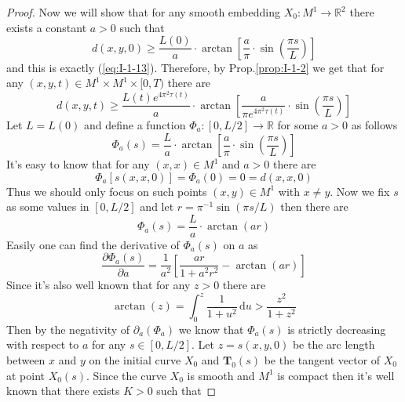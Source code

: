\begin{proof}
    Now we will show that for any smooth embedding $X_0:M^1\to\mathbb{R}^2$ there exists a constant $a>0$ such that
    \begin{equation}\label{eq:I-1-12}
        d(x,y,0)\ge\frac{L(0)}{a}\cdot\arctan{\left[\frac{a}{\pi}\cdot\sin{\left(\frac{\pi s}{L}\right)}\right]}
    \end{equation}
    and this is exactly (\ref{eq:I-1-13}). Therefore, by Prop.\ref{prop:I-1-2} we get that for any $(x,y,t)\in M^1\times M^1\times[0,T)$ there are
    \begin{equation}\label{eq:I-1-14}
        d(x,y,t)\ge\frac{L(t)e^{4\pi^2\tau{(t)}}}{a}\cdot\arctan{\left[\frac{a}{\pi e^{4\pi^2\tau{(t)}}}\cdot\sin{\left(\frac{\pi s}{L}\right)}\right]}
    \end{equation}
    Let $L=L(0)$ and define a function $\Phi_a:[0,L/2]\to\mathbb{R}$ for some $a>0$ as follows
    \begin{equation*}
        \Phi_a(s)=\frac{L}{a}\cdot\arctan{\left[\frac{a}{\pi}\cdot\sin{\left(\frac{\pi s}{L}\right)}\right]}
    \end{equation*}
    It's easy to know that for any $(x,x)\in M^1$ and $a>0$ there are
    \begin{equation*}
        \Phi_a\left[s(x,x,0)\right]=\Phi_a(0)=0=d(x,x,0)
    \end{equation*}
    Thus we should only focus on such points $(x,y)\in M^1$ with $x\neq y$. Now we fix $s$ as some values in $[0,L/2]$ and let $r=\pi^{-1}\sin{\left(\pi s/L\right)}$ then there are
    \begin{equation*}
        \Phi_a(s)=\frac{L}{a}\cdot\arctan{(ar)}
    \end{equation*}
    Easily one can find the derivative of $\Phi_a(s)$ on $a$ as
    \begin{equation*}
        \frac{\partial\Phi_a(s)}{\partial a}=\frac{1}{a^2}\left[\frac{ar}{1+a^2 r^2}-\arctan{(ar)}\right]
    \end{equation*}
    Since it's also well known that for any $z>0$ there are
    \begin{equation*}
        \arctan{(z)}=\int_{0}^{z}\frac{1}{1+u^2}\,\mathrm{d}u>\frac{z^2}{1+z^2}
    \end{equation*}
    Then by the negativity of $\partial_a (\Phi_a)$ we know that $\Phi_a(s)$ is strictly decreasing with respect to $a$ for any $s\in[0,L/2]$. Let $z=s(x,y,0)$ be the arc length between $x$ and $y$ on the initial curve $X_0$ and $\mathbf{T}_0(s)$ be the tangent vector of $X_0$ at point $X_0(s)$. Since the curve $X_0$ is smooth and $M^1$ is compact then it's well known that there exists $K>0$ such that

\end{proof}
